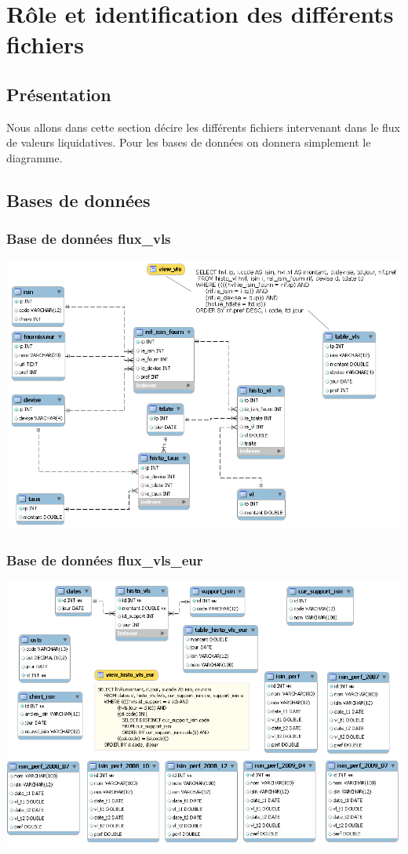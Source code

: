 \section{Rôle et identification des différents fichiers}
\subsection{Présentation}
Nous allons dans cette section décire les différents fichiers intervenant dans le flux de valeurs liquidatives. Pour les bases de données on donnera simplement le diagramme.
\subsection{Bases de données}
\subsubsection{Base de données flux{\_}vls}
	\begin{changemargin}{-2.5cm}{-1cm}
		\includegraphics[scale=0.6]{images/flux_vls_map.png} 
	\end{changemargin}
	\clearpage
\subsubsection{Base de données flux{\_}vls{\_}eur}
	\begin{changemargin}{-2.5cm}{-1cm}
		\includegraphics[scale=0.6]{images/flux_vls_eur_map.png} 
	\end{changemargin}	
